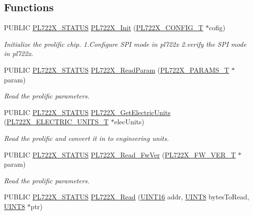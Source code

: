 \subsection*{Functions}
\begin{DoxyCompactItemize}
\item 
PUBLIC \hyperlink{a00486_a2bb5dcead34a0fa5b7fca8986b66fa8c}{PL722X\_\-STATUS} \hyperlink{a00486_af09b33c19ebcc67ad3c405684f320339}{PL722X\_\-Init} (\hyperlink{a00449}{PL722X\_\-CONFIG\_\-T} $\ast$cofig)
\begin{DoxyCompactList}\small\item\em Initialize the prolific chip. 1.Configure SPI mode in pl722x 2.verify the SPI mode in pl722x. \end{DoxyCompactList}\item 
PUBLIC \hyperlink{a00486_a2bb5dcead34a0fa5b7fca8986b66fa8c}{PL722X\_\-STATUS} \hyperlink{a00486_ae1cf0085a492216194d8cf05b6f11cd1}{PL722X\_\-ReadParam} (\hyperlink{a00453}{PL722X\_\-PARAMS\_\-T} $\ast$param)
\begin{DoxyCompactList}\small\item\em Read the prolific parameters. \end{DoxyCompactList}\item 
PUBLIC \hyperlink{a00486_a2bb5dcead34a0fa5b7fca8986b66fa8c}{PL722X\_\-STATUS} \hyperlink{a00486_adf46efb1131cf2da7c821ae906280b79}{PL722X\_\-GetElectricUnits} (\hyperlink{a00450}{PL722X\_\-ELECTRIC\_\-UNITS\_\-T} $\ast$elecUnits)
\begin{DoxyCompactList}\small\item\em Read the prolific and convert it in to engineering units. \end{DoxyCompactList}\item 
PUBLIC \hyperlink{a00486_a2bb5dcead34a0fa5b7fca8986b66fa8c}{PL722X\_\-STATUS} \hyperlink{a00486_ac2327d5a0de088c8874af54611f05cc7}{PL722X\_\-Read\_\-FwVer} (\hyperlink{a00451}{PL722X\_\-FW\_\-VER\_\-T} $\ast$param)
\begin{DoxyCompactList}\small\item\em Read the prolific parameters. \end{DoxyCompactList}\item 
PUBLIC \hyperlink{a00486_a2bb5dcead34a0fa5b7fca8986b66fa8c}{PL722X\_\-STATUS} \hyperlink{a00486_acb416193cf2da8aad8dccbb9c4903595}{PL722X\_\-Read} (\hyperlink{a00660_ga09f1a1fb2293e33483cc8d44aefb1eb1}{UINT16} addr, \hyperlink{a00660_gab27e9918b538ce9d8ca692479b375b6a}{UINT8} bytesToRead, \hyperlink{a00660_gab27e9918b538ce9d8ca692479b375b6a}{UINT8} $\ast$ptr)

\end{DoxyCompactItemize}
